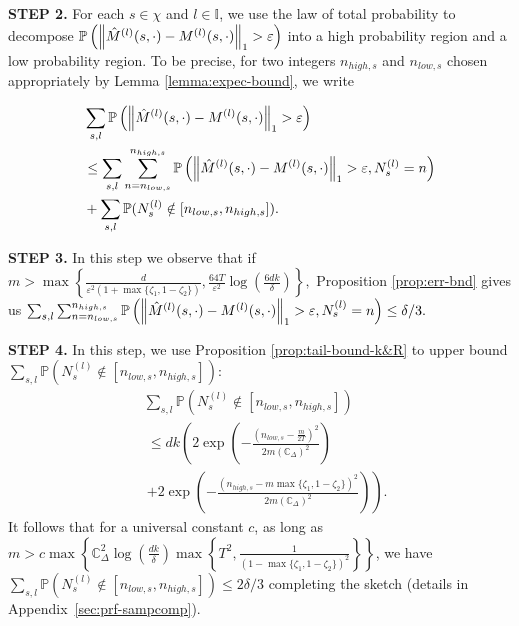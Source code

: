 \documentclass[opre,sglanonrev]{informs4}
\numberwithin{equation}{section}
\newcommand{\lp}{\left(}
\newcommand{\rp}{\right)}
\newcommand{\lc}{\left\{}
\newcommand{\rc}{\right\}}
\newcommand{\ldot}{\left.}
\newcommand{\rdot}{\right.}
\newcommand{\Cbb}{\mathbb{C}}
\newcommand{\Ibb}{\mathbb{I}}
\newcommand{\Pbb}{\mathbb{P}}
\newcommand{\constant}{\Cbb}
\newcommand{\hatmls}{\Hat{M}^{(l)}(s,\cdot)}
\newcommand{\mls}{{M}^{(l)}(s,\cdot)}
\newcommand{\prob}{\Pbb}
\newcommand{\eps}{\varepsilon}
\renewcommand{\epsilon}{\eps}
\begin{document}
{\noindent \textbf{STEP 2.} For each $s\in \chi$ and $l\in \Ibb$, we use the law of total probability \citep[Proposition 4.1]{gut2005probability} to decompose $\prob\left(\left\|\hatmls-\mls\right\|_1 > \epsilon\right)$ into a high probability region and a low probability region. 
To be precise, for two integers $n_{high,s}$ and $n_{low,s}$ chosen appropriately by Lemma \ref{lemma:expec-bound}, we write
\begin{small}
\begin{align*}
    &\sum_{s,l}\prob\left(\left\|\hatmls-\mls\right\|_1 > \epsilon\right) \\ 
    & \leq \sum_{s,l}\sum_{n=n_{low,s}}^{n_{high,s}} \prob\left(\left\|\hatmls-\mls\right\|_1 > \epsilon, N_s^{(l)}=n \right)\\
    & +\sum_{s,l}\prob(N_s^{(l)}\notin [n_{low,s} ,n_{high,s}]).
\end{align*}
\end{small}
\textbf{STEP 3.}
In this step we observe that if
$
    m>\max\lc\frac{d}{\epsilon^2\left({1+\max\{\zeta_1,1-\zeta_2\}}\right)},\frac{64T}{\eps^2}\log\lp \frac{6dk}{\delta} \rp\rc,
$
Proposition \ref{prop:err-bnd} gives us $\sum_{s,l}\sum_{n=n_{low,s}}^{n_{high,s}} \prob\left(\left\|\hatmls-\mls\right\|_1 > \epsilon, N_s^{(l)}=n \right) \leq \delta/3.$

\noindent \textbf{STEP 4.}
In this step, we use Proposition \ref{prop:tail-bound-k&R} to upper bound $\sum_{s,l}\prob(N_s^{(l)}\notin [n_{low,s} ,n_{high,s}])$: %
\begin{align*}
    &\sum_{s,l}\prob(N_s^{(l)}\notin [n_{low,s} ,n_{high,s}])\\
    &\ \leq dk\left(2 \exp\left({-{\frac{\lp n_{low,s}-\frac{m}{2T}\rp^2}{2m\lp\constant_\Delta\rp^2}}}\right)
      \rdot\\
      & \ \ldot+ 2 \exp\left({-{\frac{\lp n_{high,s}-m\max\{\zeta_1,1-\zeta_2\}\rp^2}{2m\lp\constant_\Delta\rp^2}}}\right)\right).
\end{align*}
It follows that for a universal constant $c$, as long as
$m>c\max\lc \constant_\Delta^2\log\lp \frac{dk}{\delta} \rp\max\lc {T}^2, \frac{1}{\lp 1-\max\{\zeta_1,1-\zeta_2\}\rp^2}\rc\rc
$, we have
$ \sum_{s,l}\prob(N_s^{(l)}\notin [n_{low,s} ,n_{high,s}])\leq 2\delta/3
$ completing the sketch (details in Appendix~\ref{sec:prf-sampcomp}).
{
}}
\end{document}

